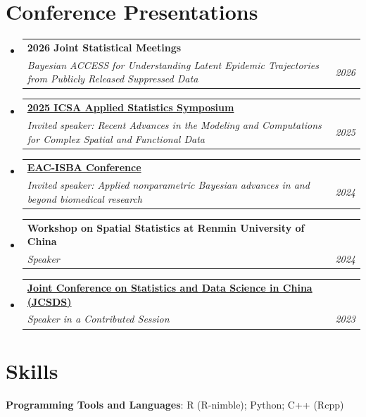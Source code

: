 \documentclass[letterpaper,11pt]{article}
\makeatletter
\newcommand{\resumeSubheading}[4]{
  \vspace{-2pt}\item
    \begin{tabular*}{0.97\textwidth}[t]{l@{\extracolsep{\fill}}r}
      \textbf{#1} & #2 \\
      \textit{\small #3} & \textit{\small #4} \\
    \end{tabular*}\vspace{-10pt}
}
\newcommand{\resumeSubHeadingListStart}{\begin{itemize}[leftmargin=0.15in, label={}]}
\newcommand{\resumeSubHeadingListEnd}{\end{itemize}}
\makeatother
\begin{document}
\section{Conference Presentations}
\resumeSubHeadingListStart
    \resumeSubheading
    {\textbf{2026 Joint Statistical Meetings}}{}
    {Bayesian ACCESS for Understanding Latent Epidemic Trajectories from Publicly Released Suppressed Data}{2026}
    \resumeSubheading
    {\href{https://symposium2025.icsa.org/}{\textbf{2025 ICSA Applied Statistics Symposium}}}{}
    {Invited speaker: Recent Advances in the Modeling and Computations for Complex Spatial and Functional Data}{2025}
    \resumeSubheading
    {\href{https://www.eduhk.hk/eac-isba2024/}{\textbf{EAC-ISBA Conference}}}{}
    {Invited speaker: \textit{Applied nonparametric Bayesian advances in and beyond biomedical research}}{2024}
    \resumeSubheading
    {Workshop on Spatial Statistics at Renmin University of China}{}
    {Speaker}{2024}
    \resumeSubheading
    {\href{https://www.stat-center.pku.edu.cn/en/jointstatisticalanddatasciencemeetingofchina/aboutjsmchina/index.htm}{Joint Conference on Statistics and Data Science in China (JCSDS)}}{}
    {Speaker in a Contributed Session}{2023}
\resumeSubHeadingListEnd


\section{Skills}
\begin{itemize}[leftmargin=0.15in, label={}]
    \normalsize{\item{
     \textbf{Programming Tools and Languages}{: R (R-nimble); Python; C++ (Rcpp)} 
    }}
 \end{itemize}

\end{document}
